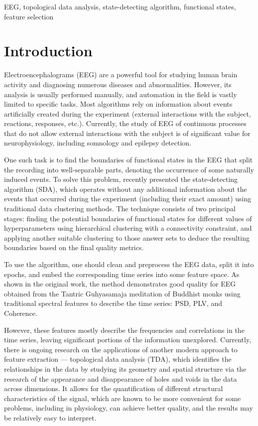 \documentclass[journal,twoside,web]{ieeecolor2}
\begin{document}
\begin{IEEEkeywords}
EEG, topological data analysis, state-detecting algorithm, functional states, feature selection
\end{IEEEkeywords}

\section{Introduction}

Electroencephalograms (EEG) are a powerful tool for studying human brain activity and diagnosing numerous diseases and abnormalities. However, its analysis is usually performed manually, and automation in the field is vastly limited to specific tasks. Most algorithms rely on information about events artificially created during the experiment (external interactions with the subject, reactions, responses, etc.). Currently, the study of EEG of continuous processes that do not allow external interactions with the subject is of significant value for neurophysiology, including somnology and epilepsy detection.

One such task is to find the boundaries of functional states in the EEG that split the recording into well-separable parts, denoting the occurrence of some naturally induced events. To solve this problem, \cite{SDA} recently presented the state-detecting algorithm (SDA), which operates without any additional information about the events that occurred during the experiment (including their exact amount) using traditional data clustering methods. The technique consists of two principal stages: finding the potential boundaries of functional states for different values of hyperparameters using hierarchical clustering with a connectivity constraint, and applying another suitable clustering to those answer sets to deduce the resulting boundaries based on the final quality metrics.

To use the algorithm, one should clean and preprocess the EEG data, split it into epochs, and embed the corresponding time series into some feature space. As shown in the original work, the method demonstrates good quality for EEG obtained from the Tantric Guhyasamaja meditation of Buddhist monks using traditional spectral features to describe the time series: PSD, PLV, and Coherence.

However, these features mostly describe the frequencies and correlations in the time series, leaving significant portions of the information unexplored. Currently, there is ongoing research on the applications of another modern approach to feature extraction --- topological data analysis (TDA), which identifies the relationships in the data by studying its geometry and spatial structure via the research of the appearance and disappearance of holes and voids in the data across dimensions. It allows for the quantification of different structural characteristics of the signal, which are known to be more convenient for some problems, including in physiology, can achieve better quality, and the results may be relatively easy to interpret.
\end{document}
